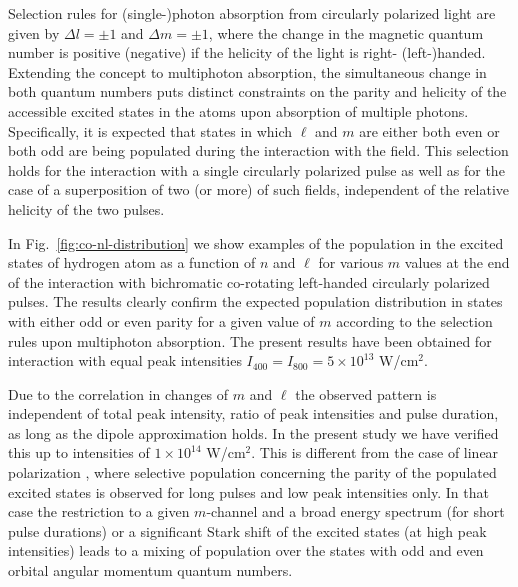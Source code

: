 Selection rules for (single-)photon absorption from circularly polarized light are given by $\Delta l = \pm 1$ and $\Delta m = \pm 1$, where the change in the magnetic quantum number is positive (negative) if the helicity of the light is right- (left-)handed. Extending the concept to multiphoton absorption, the simultaneous change in both quantum numbers puts distinct constraints on the parity and helicity of the accessible excited states in the atoms upon absorption of multiple photons. Specifically, it is expected that states in which $\ell$ and $m$ are either both even or both odd are being populated during the interaction with the field. This selection holds for the interaction with a single circularly polarized pulse as well as for the case of a superposition of two (or more) of such fields, independent of the relative helicity of the two pulses. 

In Fig.~\ref{fig:co-nl-distribution} we show examples of the population in the excited states of hydrogen atom as a function of $n$ and $\ell$ for various $m$ values at the end of the interaction with bichromatic co-rotating left-handed circularly polarized pulses. The results clearly confirm the expected population distribution in states with either odd or even parity for a given value of $m$ according to the selection rules upon multiphoton absorption. The present results have been obtained for interaction with equal peak intensities $I_{400} = I_{800} = 5\times 10^{13}$ W/cm$^2$. 

Due to the correlation in changes of $m$ and $\ell$ the observed pattern is independent of total peak intensity, ratio of peak intensities and pulse duration, as long as the dipole approximation holds. In the present study we have verified this up to intensities of $1 \times 10^{14}$ W/cm$^2$. This is different from the case of linear polarization \cite{venzke2018_ryd}, where selective population concerning the parity of the populated excited states is observed for long pulses and low peak intensities only. In that case the restriction to a given $m$-channel and a broad energy spectrum (for short pulse durations) or a significant Stark shift of the excited states (at high peak intensities) leads to a mixing of population over the states with odd and even orbital angular momentum quantum numbers.

